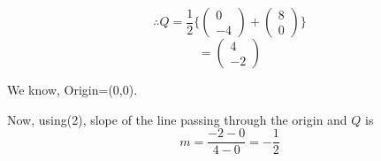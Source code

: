 \documentclass{article}
\begin{document}
\begin{equation*}
    \therefore
    Q=\frac{1}{2}\Bigg\{
    \left(\begin{array}{c}
    0\\
    -4
    \end{array}\right)
    +
    \left(\begin{array}{c}
    8\\
    0
    \end{array}\right)\Bigg\}
\end{equation*}
\begin{equation*}
    =\left(\begin{array}{c}
    4\\
    -2
\end{array}\right)
\end{equation*}

\break
We know, Origin=(0,0).

Now, using(2), slope of the line passing through the origin and $Q$ is
\begin{equation*}
    m=\frac{-2-0}{4-0}
    =-\frac{1}{2}
\end{equation*}
\end{document}
